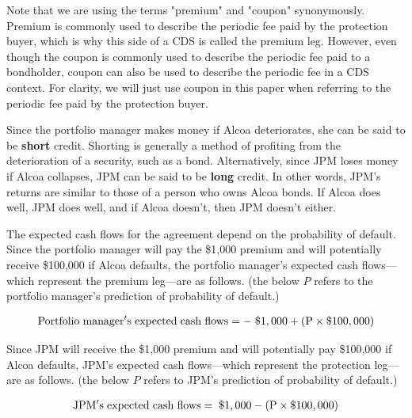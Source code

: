 \documentclass{jss}
\begin{document}
Note that we are using the terms "premium" and "coupon" synonymously. Premium is commonly used to describe the periodic fee paid by the protection buyer, which is why this side of a CDS is called the premium leg. However, even though the coupon is commonly used to describe the periodic fee paid to a bondholder, coupon can also be used to describe the periodic fee in a CDS context. For clarity, we will just use coupon in this paper when referring to the periodic fee paid by the protection buyer.

Since the portfolio manager makes money if Alcoa deteriorates, she can be said to be \textbf{short} credit. Shorting is generally a method of profiting from the deterioration of a security, such as a bond. Alternatively, since JPM loses money if Alcoa collapses, JPM can be said to be \textbf{long} credit. In other words, JPM's returns are similar to those of a person who owns Alcoa bonds. If Alcoa does well, JPM does well, and if Alcoa doesn't, then JPM doesn't either.

The expected cash flows for the agreement depend on the probability of default. Since the portfolio manager will pay the \$1,000 premium and will potentially receive \$100,000 if Alcoa defaults, the portfolio manager's expected cash flows---which represent the premium leg---are as follows. (the below $P$ refers to the portfolio manager’s prediction of probability of default.)

\begin{equation}
 \begin{aligned}
   {\rm Portfolio\hspace{3pt}manager's\hspace{3pt}expected\hspace{3pt}cash\hspace{3pt}flows = -\hspace{3pt}\$1,000 + (P \times {\$100,000})}
    \end{aligned}
    \label{eqn:portfolioECF}
\end{equation}

Since JPM will receive the \$1,000 premium and will potentially pay \$100,000 if Alcoa defaults, JPM's expected cash flows---which represent the protection leg---are as follows. (the below $P$ refers to JPM’s prediction of probability of default.)

\begin{equation}
 \begin{aligned}
   {\rm JPM's\hspace{3pt}expected\hspace{3pt}cash\hspace{3pt}flows = \hspace{3pt}\$1,000 - (P \times {\$100,000})}
    \end{aligned}
    \label{eqn:jpmECF}
\end{equation}
\end{document}
